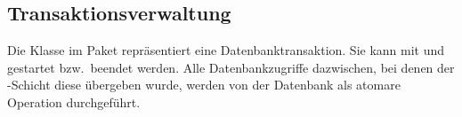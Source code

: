 \subsection{Transaktionsverwaltung}\label{subsec:lokalisierung}
Die Klasse  im Paket  repräsentiert eine Datenbanktransaktion.
Sie kann mit  und  gestartet bzw.\ beendet werden.
Alle Datenbankzugriffe dazwischen, bei denen der -Schicht diese  übergeben wurde, werden von der Datenbank als atomare Operation durchgeführt.